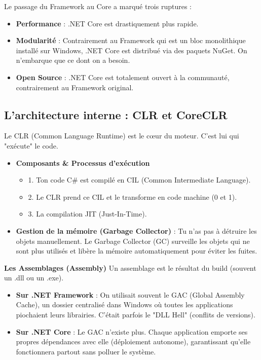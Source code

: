 \newpage

\noindent Le passage du Framework au Core a marqué trois ruptures :

\begin{itemize}
	\item \textbf{Performance} : .NET Core est drastiquement plus rapide.
	\item \textbf{Modularité} : Contrairement au Framework qui est un bloc monolithique installé sur Windows, .NET Core est distribué via des paquets NuGet. On n'embarque que ce dont on a besoin.
	\item \textbf{Open Source} : .NET Core est totalement ouvert à la communauté, contrairement au Framework original.
\end{itemize}

\vspace{0.5cm}

\subsection*{L'architecture interne : CLR et CoreCLR}
{}
\noindent Le CLR (Common Language Runtime) est le cœur du moteur. C'est lui qui "exécute" le code.

\begin{itemize}
	\item \textbf{Composants \& Processus d'exécution}
	\begin{itemize}
		\item 1. Ton code C\# est compilé en CIL (Common Intermediate Language).
		\item 2. Le CLR prend ce CIL et le transforme en code machine (0 et 1).
		\item 3. La compilation JIT (Just-In-Time).
	\end{itemize}
	\item \textbf{Gestion de la mémoire (Garbage Collector)} : Tu n'as pas à détruire les objets manuellement. Le Garbage Collector (GC) surveille les objets qui ne sont plus utilisés et libère la mémoire automatiquement pour éviter les fuites.
\end{itemize}

\vspace{0.5cm}

\noindent \textbf{Les Assemblages (Assembly)}
\noindent Un assemblage est le résultat du build (souvent un .dll ou un .exe).
\begin{itemize}
	\item \textbf{Sur .NET Framework} : On utilisait souvent le GAC (Global Assembly Cache), un dossier centralisé dans Windows où toutes les applications piochaient leurs librairies. C'était parfois le "DLL Hell" (conflits de versions).
	\item \textbf{Sur .NET Core} : Le GAC n'existe plus. Chaque application emporte ses propres dépendances avec elle (déploiement autonome), garantissant qu'elle fonctionnera partout sans polluer le système.
\end{itemize}

